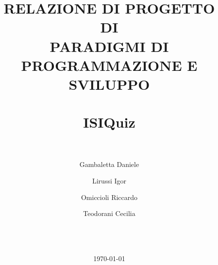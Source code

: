 \documentclass{report}
\title{\LARGE
    RELAZIONE DI PROGETTO  \\ DI \\ PARADIGMI DI PROGRAMMAZIONE E SVILUPPO \\
    \hrulefill \\
    \textbf{ISIQuiz} \\ 
    \hrulefill \\
}
\author{
    Gambaletta Daniele \\ \emailaddr{daniele.gambaletta@studio.unibo.it}
    \and
    Lirussi Igor \\ \emailaddr{igor.lirussi@studio.unibo.it}
    \and 
    Omiccioli Riccardo \\ \emailaddr{riccardo.omiccioli@studio.unibo.it} 
    \and 
    Teodorani Cecilia \\ \emailaddr{cecilia.teodorani@studio.unibo.it} 
    \\ \\ \\ 
}
\date{\today}
\begin{document}
\renewcommand{\labelenumii}{\arabic{enumi}.\arabic{enumii}}
\renewcommand{\labelenumiii}{\arabic{enumi}.\arabic{enumii}.\arabic{enumiii}}
\renewcommand{\labelenumiv}{\arabic{enumi}.\arabic{enumii}.\arabic{enumiii}.\arabic{enumiv}}

\maketitle

\tableofcontents

    
    
    
    
    
    
    
    
    
    
    


\nocite{*} %
\printbibliography[title={Bibliografia}]
\end{document}
